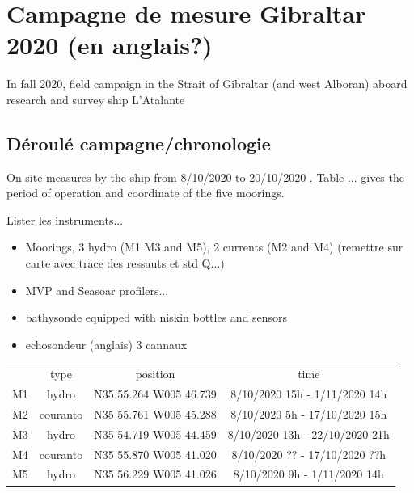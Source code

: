 \hypersetup{pdfborder=0 0 0}



\section{Campagne de mesure Gibraltar 2020 (en anglais?)}
In fall 2020, field campaign in the Strait of Gibraltar (and west Alboran) aboard research and survey ship L'Atalante

\subsection{Déroulé campagne/chronologie}


On site measures by the ship from 8/10/2020 to 20/10/2020 . Table ... gives the period of operation and coordinate of the five moorings.


Lister les instruments...

\begin{itemize}
\item Moorings, 3 hydro (M1 M3 and M5), 2 currents (M2 and M4)  (remettre sur carte avec trace des ressauts et std Q...)
\item MVP and Seasoar profilers...
\item bathysonde equipped with niskin bottles and sensors
\item echosondeur (anglais) 3 cannaux
\end{itemize}

\begin{table}[!h]
        \centering
        \begin{tabular}{|c|c|c|c|}
                \hline
                 & type & position & time \\ 
                M1 & hydro & N35 55.264 W005 46.739 & 8/10/2020 15h - 1/11/2020 14h\\
                M2 & couranto & N35 55.761 W005 45.288 & 8/10/2020 5h - 17/10/2020 15h\\
                M3 & hydro & N35 54.719 W005 44.459 & 8/10/2020 13h - 22/10/2020 21h\\
                M4 & couranto & N35 55.870 W005 41.020 & 8/10/2020 ?? - 17/10/2020 ??h\\
                M5 & hydro & N35 56.229 W005 41.026 & 8/10/2020 9h - 1/11/2020 14h\\
                \hline
        \end{tabular}
\end{table}


